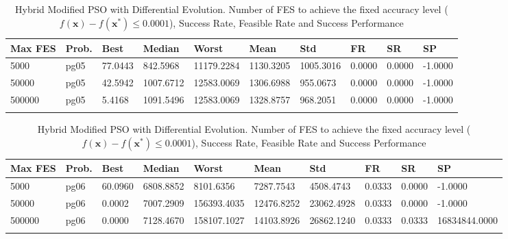 \documentclass[10pt, a4paper]{book}
\begin{document}
\begin{center}
\begin{longtable}{l l l l l l l l l l}
\textbf{Max FES} & \textbf{Prob.} & \textbf{Best} & \textbf{Median} & \textbf{Worst} & \textbf{Mean} & \textbf{Std} & \textbf{FR} & \textbf{SR} & \textbf{SP} \\
\hline
5000 & pg05 & 77.0443 & 842.5968 & 11179.2284 & 1130.3205 & 1005.3016 & 0.0000 & 0.0000 & -1.0000 \\
50000 & pg05 & 42.5942 & 1007.6712 & 12583.0069 & 1306.6988 & 955.0673 & 0.0000 & 0.0000 & -1.0000 \\
500000 & pg05 & 5.4168 & 1091.5496 & 12583.0069 & 1328.8757 & 968.2051 & 0.0000 & 0.0000 & -1.0000 \\

\caption{ Hybrid Modified PSO with Differential Evolution. Number of FES to achieve the fixed accuracy level ($f(\mathbf{x}) - f(\mathbf{x}^{*}) \leq 0.0001$), Success Rate, Feasible Rate and Success Performance }
\end{longtable}
\end{center}

\begin{center}
\begin{longtable}{l l l l l l l l l l}
\textbf{Max FES} & \textbf{Prob.} & \textbf{Best} & \textbf{Median} & \textbf{Worst} & \textbf{Mean} & \textbf{Std} & \textbf{FR} & \textbf{SR} & \textbf{SP} \\
\hline
5000 & pg06 & 60.0960 & 6808.8852 & 8101.6356 & 7287.7543 & 4508.4743 & 0.0333 & 0.0000 & -1.0000 \\
50000 & pg06 & 0.0002 & 7007.2909 & 156393.4035 & 12476.8252 & 23062.4928 & 0.0333 & 0.0000 & -1.0000 \\
500000 & pg06 & 0.0000 & 7128.4670 & 158107.1027 & 14103.8926 & 26862.1240 & 0.0333 & 0.0333 & 16834844.0000 \\

\caption{ Hybrid Modified PSO with Differential Evolution. Number of FES to achieve the fixed accuracy level ($f(\mathbf{x}) - f(\mathbf{x}^{*}) \leq 0.0001$), Success Rate, Feasible Rate and Success Performance }
\end{longtable}
\end{center}
\end{document}
